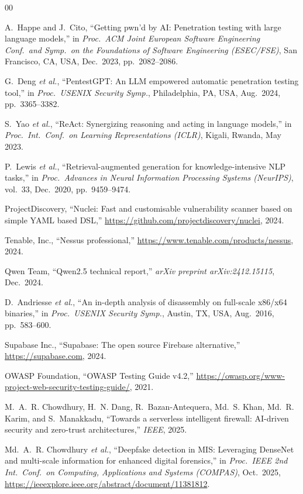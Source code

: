 \documentclass[conference]{IEEEtran}
\begin{document}
\balance
\begin{thebibliography}{00}

A.~Happe and J.~Cito,
``Getting pwn'd by AI: Penetration testing with large language models,''
in \textit{Proc.\ ACM Joint European Software Engineering Conf.\ and
  Symp.\ on the Foundations of Software Engineering (ESEC/FSE)},
San Francisco, CA, USA, Dec.\ 2023, pp.\ 2082--2086.

G.~Deng \textit{et al.},
``PentestGPT: An LLM empowered automatic penetration testing tool,''
in \textit{Proc.\ USENIX Security Symp.}, Philadelphia, PA, USA,
Aug.\ 2024, pp.\ 3365--3382.

S.~Yao \textit{et al.},
``ReAct: Synergizing reasoning and acting in language models,''
in \textit{Proc.\ Int.\ Conf.\ on Learning Representations (ICLR)},
Kigali, Rwanda, May 2023.

P.~Lewis \textit{et al.},
``Retrieval-augmented generation for knowledge-intensive NLP tasks,''
in \textit{Proc.\ Advances in Neural Information Processing Systems
  (NeurIPS)}, vol.\ 33, Dec.\ 2020, pp.\ 9459--9474.

ProjectDiscovery,
``Nuclei: Fast and customisable vulnerability scanner based on simple
  YAML based DSL,''
\url{https://github.com/projectdiscovery/nuclei}, 2024.

Tenable, Inc.,
``Nessus professional,''
\url{https://www.tenable.com/products/nessus}, 2024.

Qwen Team,
``Qwen2.5 technical report,''
\textit{arXiv preprint arXiv:2412.15115}, Dec.\ 2024.

D.~Andriesse \textit{et al.},
``An in-depth analysis of disassembly on full-scale x86/x64 binaries,''
in \textit{Proc.\ USENIX Security Symp.}, Austin, TX, USA,
Aug.\ 2016, pp.\ 583--600.

Supabase Inc.,
``Supabase: The open source Firebase alternative,''
\url{https://supabase.com}, 2024.

OWASP Foundation,
``OWASP Testing Guide v4.2,''
\url{https://owasp.org/www-project-web-security-testing-guide/}, 2021.

M.~A.~R. Chowdhury, H.~N. Dang, R.~Bazan-Antequera,
  Md.~S. Khan, Md.~R. Karim, and S.~Manakkadu,
``Towards a serverless intelligent firewall: AI-driven security
  and zero-trust architectures,''
\textit{IEEE}, 2025.

Md.~A.~R. Chowdhury \textit{et al.},
``Deepfake detection in MIS: Leveraging DenseNet and multi-scale
  information for enhanced digital forensics,''
in \textit{Proc.\ IEEE 2nd Int.\ Conf.\ on Computing, Applications
  and Systems (COMPAS)}, Oct.\ 2025,
\url{https://ieeexplore.ieee.org/abstract/document/11381812}.

\end{thebibliography}
\end{document}
